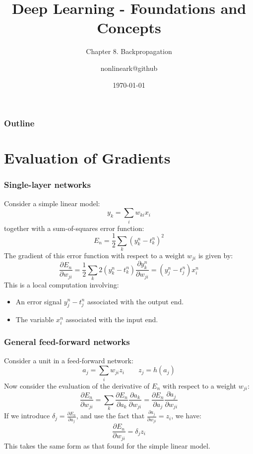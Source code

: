 \documentclass{beamer}
\title{Deep Learning - Foundations and Concepts}
\subtitle{Chapter 8. Backpropagation}
\author{nonlineark@github}
\date{\today}
\begin{document}
\begin{frame}
    \titlepage
\end{frame}

\begin{frame}
    \frametitle{Outline}
    \tableofcontents
\end{frame}

\section{Evaluation of Gradients}

\begin{frame}
    \frametitle{Single-layer networks}
    Consider a simple linear model:
    \begin{equation*}
        y_{k}=\sum_{i}w_{ki}x_{i}
    \end{equation*}
    together with a sum-of-squares error function:
    \begin{equation*}
        E_{n}=\frac{1}{2}\sum_{k}(y^{n}_{k}-t^{n}_{k})^{2}
    \end{equation*}
    The gradient of this error function with respect to a weight $w_{ji}$ is given by:
    \begin{equation*}
        \frac{\partial{}E_{n}}{\partial{}w_{ji}}=\frac{1}{2}\sum_{k}2(y^{n}_{k}-t^{n}_{k})\frac{\partial{}y^{n}_{k}}{\partial{}w_{ji}}=(y^{n}_{j}-t^{n}_{j})x^{n}_{i}
    \end{equation*}
    This is a local computation involving:
    \begin{itemize}
        \item An error signal $y^{n}_{j}-t^{n}_{j}$ associated with the output end.
        \item The variable $x^{n}_{i}$ associated with the input end.
    \end{itemize}
\end{frame}

\begin{frame}
    \frametitle{General feed-forward networks}
    Consider a unit in a feed-forward network:
    \begin{equation*}
        a_{j}=\sum_{i}w_{ji}z_{i}\qquad{}z_{j}=h(a_{j})
    \end{equation*}
    Now consider the evaluation of the derivative of $E_{n}$ with respect to a weight $w_{ji}$:
    \begin{equation*}
        \frac{\partial{}E_{n}}{\partial{}w_{ji}}=\sum_{k}\frac{\partial{}E_{n}}{\partial{}a_{k}}\frac{\partial{}a_{k}}{\partial{}w_{ji}}=\frac{\partial{}E_{n}}{\partial{}a_{j}}\frac{\partial{}a_{j}}{\partial{}w_{ji}}
    \end{equation*}
    If we introduce $\delta_{j}=\frac{\partial{}E_{n}}{\partial{}a_{j}}$, and use the fact that $\frac{\partial{}a_{j}}{\partial{}w_{ji}}=z_{i}$, we have:
    \begin{equation*}
        \frac{\partial{}E_{n}}{\partial{}w_{ji}}=\delta_{j}z_{i}
    \end{equation*}
    This takes the same form as that found for the simple linear model.
\end{frame}
\end{document}
